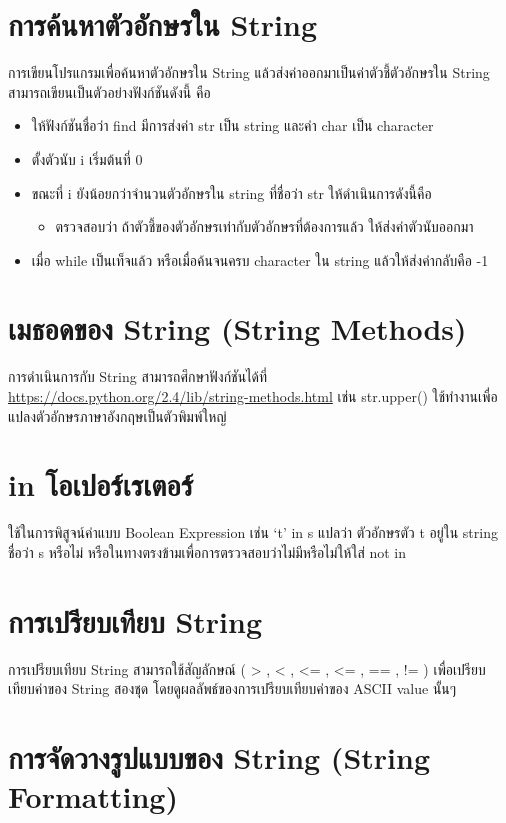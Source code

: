 \section{การค้นหาตัวอักษรใน String}

การเขียนโปรแกรมเพื่อค้นหาตัวอักษรใน String แล้วส่งค่าออกมาเป็นค่าตัวชี้ตัวอักษรใน String สามารถเขียนเป็นตัวอย่างฟังก์ชันดังนี้ คือ 

\begin{itemize}
\item ให้ฟังก์ชันชื่อว่า find มีการส่งค่า str เป็น string และค่า char เป็น character 
\item ตั้งตัวนับ i เริ่มต้นที่ 0
\item ขณะที่ i ยังน้อยกว่าจำนวนตัวอักษรใน string ที่ชื่อว่า str ให้ดำเนินการดังนี้คือ
	\begin{itemize}
		\item ตรวจสอบว่า ถ้าตัวชี้ของตัวอักษรเท่ากับตัวอักษรที่ต้องการแล้ว ให้ส่งค่าตัวนับออกมา
	\end{itemize}
\item เมื่อ while เป็นเท็จแล้ว หรือเมื่อค้นจนครบ character ใน string แล้วให้ส่งค่ากลับคือ -1
\end{itemize}

\section{เมธอดของ String (String Methods)}

การดำเนินการกับ String สามารถศึกษาฟังก์ชันได้ที่ \url{https://docs.python.org/2.4/lib/string-methods.html} เช่น str.upper() ใช้ทำงานเพื่อแปลงตัวอักษรภาษาอังกฤษเป็นตัวพิมพ์ใหญ่

\section{in โอเปอร์เรเตอร์}

ใช้ในการพิสูจน์ค่าแบบ Boolean Expression เช่น ‘t’ in s แปลว่า ตัวอักษรตัว t อยู่ใน string ชื่อว่า s หรือไม่ หรือในทางตรงข้ามเพื่อการตรวจสอบว่าไม่มีหรือไม่ให้ใส่ not in 

\section{การเปรียบเทียบ String}

การเปรียบเทียบ String สามารถใช้สัญลักษณ์  ( > , < , <= , <= , == , !=  ) เพื่อเปรียบเทียบค่าของ String สองชุด โดยดูผลลัพธ์ของการเปรียบเทียบค่าของ ASCII value นั้นๆ

\section{การจัดวางรูปแบบของ String (String Formatting)}

